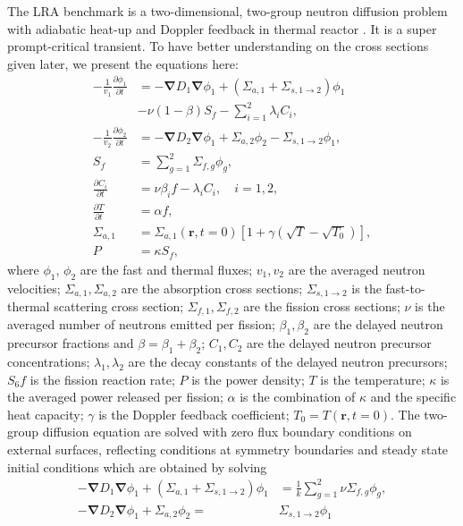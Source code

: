 \documentclass{anstrans}
\renewcommand{\vec}[1]{\bm{#1}} %
\newcommand{\bs}[1]{\mathbf{#1}}
\newcommand{\grad}{\bs{\nabla}}
\begin{document}
The LRA benchmark is a two-dimensional, two-group neutron diffusion problem with adiabatic heat-up and Doppler feedback in thermal reactor \cite{BPB}.  It is a super prompt-critical transient.  To have better understanding on the cross sections given later, we present the equations here:
\begin{align}
-\frac{1}{v_1} \frac{\partial \phi_1}{\partial t} &= -\grad D_1 \grad\phi_1 + (\Sigma_{a,1} + \Sigma_{s, 1\rightarrow 2})\phi_1 \nonumber \\
&- \nu(1-\beta)S_f  - \sum_{i=1}^2 \lambda_i C_i, \\
-\frac{1}{v_2} \frac{\partial \phi_2}{\partial t} &= -\grad D_2 \grad\phi_1 + \Sigma_{a,2}\phi_2 - \Sigma_{s, 1\rightarrow 2}\phi_1, \\
S_f &= \sum_{g=1}^2 \Sigma_{f,g} \phi_g, \\
\frac{\partial C_i}{\partial t} &= \nu\beta_i f - \lambda_i C_i, \quad i=1,2, \\
\frac{\partial T}{\partial t} &= \alpha f, \label{eq:lra-temp} \\
\Sigma_{a,1} &= \Sigma_{a,1}(\vec{r}, t=0) \left[1+\gamma\left(\sqrt{T} - \sqrt{T_0}\right)\right], \\
P &= \kappa S_f,
\end{align}
where $\phi_1$, $\phi_2$ are the fast and thermal fluxes; $v_1, v_2$ are the averaged neutron velocities; $\Sigma_{a,1}, \Sigma_{a,2}$ are the absorption cross sections; $\Sigma_{s,1\rightarrow 2}$ is the fast-to-thermal scattering cross section; $\Sigma_{f,1}, \Sigma_{f,2}$ are the fission cross sections; $\nu$ is the averaged number of neutrons emitted per fission; $\beta_1, \beta_2$ are the delayed neutron precursor fractions and $\beta=\beta_1 + \beta_2$; $C_1, C_2$ are the delayed neutron precursor concentrations; $\lambda_1, \lambda_2$ are the decay constants of the delayed neutron precursors; $S_6f$ is the fission reaction rate; $P$ is the power density; $T$ is the temperature; $\kappa$ is the averaged power released per fission; $\alpha$ is the combination of $\kappa$ and the specific heat capacity; $\gamma$ is the Doppler feedback coefficient; $T_0=T(\vec{r}, t=0)$.
The two-group diffusion equation are solved with zero flux boundary conditions on external surfaces, reflecting conditions at symmetry boundaries and steady state initial conditions which are obtained by solving
\begin{align}
-\grad D_1 \grad\phi_1 + (\Sigma_{a,1} + \Sigma_{s, 1\rightarrow 2})\phi_1 &= \frac{1}{k}\sum_{g=1}^2 \nu\Sigma_{f,g}\phi_g, \\
-\grad D_2 \grad\phi_1 + \Sigma_{a,2}\phi_2 =& \Sigma_{s, 1\rightarrow 2}\phi_1
\end{align}
\end{document}
